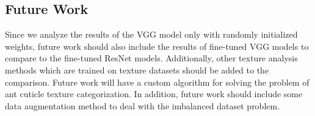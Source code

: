 \documentclass[12pt]{article}
\begin{document}
\subsection{Future Work}

Since we analyze the results of the VGG model only with randomly initialized
weights, future work should also include the results of fine-tuned VGG models to
compare to the fine-tuned ResNet models. Additionally, other texture analysis
methods which are trained on texture datasets should be added to the comparison.
Future work will have a custom algorithm for solving the problem of ant cuticle
texture categorization. In addition, future work should include some data
augmentation method to deal with the imbalanced dataset problem.

\newpage
\printbibliography[heading=bibintoc,title={REFERENCES}]
\end{document}
